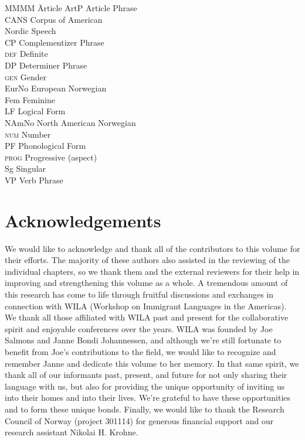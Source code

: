 \documentclass[output=paper,colorlinks,citecolor=brown]{langscibook}
\begin{document}
\begin{multicols}{2}
\begin{tabbing}
MMMM \= Article\kill
ArtP \> Article Phrase \\
CANS \> Corpus of American \\ \> Nordic Speech \\
CP \> Complementizer Phrase \\
\textsc{def} \> Definite \\
DP \> Determiner Phrase \\
\textsc{gen} \> Gender \\
EurNo  \> European Norwegian\\
Fem \> Feminine \\
LF \> Logical Form \\
NAmNo \> North American Norwegian\\
\textsc{num} \> Number \\
PF \> Phonological Form \\
\textsc{prog} \> Progressive (aspect) \\
Sg \> Singular\\
VP \> Verb Phrase 
\end{tabbing}
\end{multicols}

\section*{Acknowledgements}
We would like to acknowledge and thank all of the contributors to this volume for their efforts. The majority of these authors also assisted in the reviewing of the individual chapters, so we thank them and the external reviewers for their help in improving and strengthening this volume as a whole. A tremendous amount of this research has come to life through fruitful discussions and exchanges in connection with WILA (Workshop on Immigrant Languages in the Americas). We thank all those affiliated with WILA past and present for the collaborative spirit and enjoyable conferences over the years. WILA was founded by Joe Salmons and Janne Bondi Johannessen, and although we're still fortunate to benefit from Joe's contributions to the field, we would like to recognize and remember Janne and dedicate this volume to her memory. In that same spirit, we thank all of our informants past, present, and future for not only sharing their language with us, but also for providing the unique opportunity of inviting us into their homes and into their lives. We're grateful to have these opportunities and to form these unique bonds. Finally, we would like to thank the Research Council of Norway (project 301114) for generous financial support and our research assistant Nikolai H. Krohne.


\printbibliography[heading=subbibliography,notkeyword=this]
\end{document}
